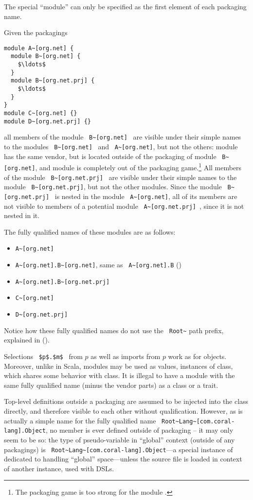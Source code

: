 The special  ``module'' can only be specified as the first element of each packaging name. 

\example Given the packagings
\begin{lstlisting}
module A~[org.net] {
  module B~[org.net] {
    $\ldots$
  }
  module B~[org.net.prj] {
    $\ldots$
  }
}
module C~[org.net] {}
module D~[org.net.prj] {}
\end{lstlisting}
all members of the module ~\lstinline!B~[org.net]!~ are visible under their simple names to the modules ~\lstinline!B~[org.net]!~ and ~\lstinline!A~[org.net]!, but not the others: module  has the same vendor, but is located outside of the packaging of module ~\lstinline!B~[org.net]!, and module  is completely out of the packaging game.\footnote{The packaging game is too strong for the module .} All members of the module ~\lstinline!B~[org.net.prj]!~ are visible under their simple names to the module ~\lstinline!B~[org.net.prj]!, but not the other modules. Since the module ~\lstinline!B~[org.net.prj]!~ is nested in the module ~\lstinline!A~[org.net]!, all of its members are not visible to members of a potential module ~\lstinline!A~[org.net.prj]!~, since it is not nested in it. 

The fully qualified names of these modules are as follows: 
\begin{itemize}
\item \lstinline!A~[org.net]!
\item \lstinline!A~[org.net].B~[org.net]!, same as ~\lstinline!A~[org.net].B! ()
\item \lstinline!A~[org.net].B~[org.net.prj]!
\item \lstinline!C~[org.net]!
\item \lstinline!D~[org.net.prj]!
\end{itemize}

Notice how these fully qualified names do not use the ~\lstinline!Root~! path prefix, explained in ().

Selections ~\lstinline!$p$.$m$!~ from $p$ as well as imports from $p$ work as for objects. Moreover, unlike in Scala, modules may be used as values, instances of  class, which shares some behavior with  class. It is illegal to have a module with the same fully qualified name (minus the vendor parts) as a class or a trait. 

Top-level definitions outside a packaging are assumed to be injected into the  class directly, and therefore visible to each other without qualification. However, as  is actually a simple name for the fully qualified name ~\lstinline!Root~Lang~[com.coral-lang].Object!, no member is ever defined outside of packaging -- it may only seem to be so: the type of  pseudo-variable in ``global'' context (outside of any packagings) is ~\lstinline!Root~Lang~[com.coral-lang].Object!---a special instance of  dedicated to handling ``global'' space---unless the source file is loaded in context of another instance, used with DSLs. 






